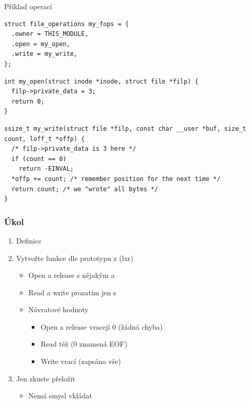 \begin{frame}[fragile]{Příklad operací}

  \begin{lstlisting}
struct file_operations my_fops = {
  .owner = THIS_MODULE,
  .open = my_open,
  .write = my_write,
};
  \end{lstlisting}
  \pause
  \begin{lstlisting}
int my_open(struct inode *inode, struct file *filp) {
  filp->private_data = 3;
  return 0;
}
  \end{lstlisting}
  \pause
  \begin{lstlisting}
ssize_t my_write(struct file *filp, const char __user *buf, size_t count, loff_t *offp) {
  /* filp->private_data is 3 here */
  if (count == 0)
    return -EINVAL;
  *offp += count; /* remember position for the next time */
  return count; /* we "wrote" all bytes */
}
  \end{lstlisting}

\end{frame}

\begin{frame}
  \frametitle{Úkol}


  \begin{enumerate}
    \item Definice 
    \item Vytvořte funkce dle prototypu z  (lxr)
    \begin{itemize}
      \item Open a release s nějakým  a 
      \item Read a write prozatím jen s 
      \item Návratové hodnoty
      \begin{itemize}
	\item Open a release vracejí 0 (žádná chyba)
	\item Read též (0 znamená EOF)
	\item Write vrací  (zapsáno vše)
      \end{itemize}

    \end{itemize}

    \item Jen zkuste přeložit
    \begin{itemize}
      \item Nemá smysl vkládat
    \end{itemize}
  \end{enumerate}

\end{frame}


